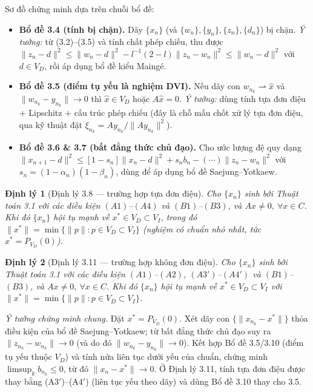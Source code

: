 \documentclass[11pt,a4paper]{article}
\theoremstyle{plain}
\newtheorem{theorem}{Định lý}
\theoremstyle{definition}
\newcommand{\nm}[1]{\lVert #1\rVert}
\newcommand{\wto}{\rightharpoonup}
\begin{document}
Sơ đồ chứng minh dựa trên chuỗi bổ đề:
\begin{itemize}[leftmargin=1.4em,itemsep=1pt]
\item \textbf{Bổ đề 3.4 (tính bị chặn).} Dãy $\{x_n\}$ (và $\{w_n\},\{y_n\},\{z_n\},\{d_n\}$) bị chặn. \emph{Ý tưởng:} từ (3.2)--(3.5) và tính chất phép chiếu, thu được $\nm{z_n-d}^2\le\nm{w_n-d}^2-l^{-1}(2-l)\nm{z_n-w_n}^2\le\nm{w_n-d}^2$ với $d\in V_D$, rồi áp dụng bổ đề kiểu Maingé.
\item \textbf{Bổ đề 3.5 (điểm tụ yếu là nghiệm DVI).} Nếu dãy con $w_{n_k}\wto\hat{x}$ và $\nm{w_{n_k}-y_{n_k}}\to0$ thì $\hat{x}\in V_D$ hoặc $A\hat{x}=0$. \emph{Ý tưởng:} dùng tính tựa đơn điệu $+$ Lipschitz $+$ cấu trúc phép chiếu (đây là chỗ mấu chốt xử lý tựa đơn điệu, qua kỹ thuật đặt $\xi_{n_k}=Ay_{n_k}/\nm{Ay_{n_k}}^2$).
\item \textbf{Bổ đề 3.6 \& 3.7 (bất đẳng thức chủ đạo).} Cho ước lượng đệ quy dạng $\nm{x_{n+1}-d}^2\le[1-s_n]\nm{x_n-d}^2+s_n b_n-(\cdots)\nm{z_n-w_n}^2$ với $s_n=(1-\alpha_n)(1-\beta_n)$, dùng để áp dụng bổ đề Saejung--Yotkaew.
\end{itemize}

\begin{theorem}[Định lý 3.8 --- trường hợp tựa đơn điệu]
Cho $\{x_n\}$ sinh bởi Thuật toán 3.1 với các điều kiện $(A1)$--$(A4)$ và $(B1)$--$(B3)$, và $Ax\ne 0,\ \forall x\in C$. Khi đó $\{x_n\}$ hội tụ mạnh về $x^{*}\in V_D\subset V_I$, trong đó $\nm{x^{*}}=\min\{\nm{p}:p\in V_D\subset V_I\}$ (nghiệm có chuẩn nhỏ nhất, tức $x^{*}=P_{V_D}(0)$).
\end{theorem}

\begin{theorem}[Định lý 3.11 --- trường hợp không đơn điệu]
Cho $\{x_n\}$ sinh bởi Thuật toán 3.1 với các điều kiện $(A1)$--$(A2)$, $(A3')$--$(A4')$ và $(B1)$--$(B3)$, và $Ax\ne 0,\ \forall x\in C$. Khi đó $\{x_n\}$ hội tụ mạnh về $x^{*}\in V_D\subset V_I$ với $\nm{x^{*}}=\min\{\nm{p}:p\in V_D\subset V_I\}$.
\end{theorem}

\noindent\emph{Ý tưởng chứng minh chung.} Đặt $x^{*}=P_{V_D}(0)$. Xét dãy con $\{\nm{x_{n_k}-x^{*}}\}$ thỏa điều kiện của bổ đề Saejung--Yotkaew; từ bất đẳng thức chủ đạo suy ra $\nm{z_{n_k}-w_{n_k}}\to0$ (và do đó $\nm{w_{n_k}-y_{n_k}}\to0$). Kết hợp Bổ đề 3.5/3.10 (điểm tụ yếu thuộc $V_D$) và tính nửa liên tục dưới yếu của chuẩn, chứng minh $\limsup_k b_{n_k}\le0$, từ đó $\nm{x_n-x^{*}}\to0$. Ở Định lý 3.11, tính tựa đơn điệu được thay bằng (A3$'$)--(A4$'$) (liên tục yếu theo dãy) và dùng Bổ đề 3.10 thay cho 3.5.
\end{document}
